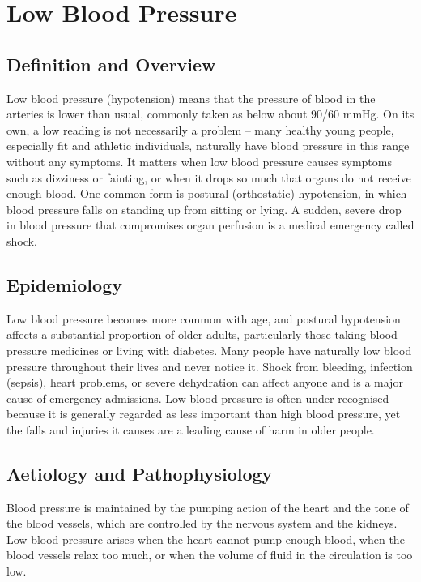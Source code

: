 \chapter{Low Blood Pressure}

\section*{Definition and Overview}
Low blood pressure (hypotension) means that the pressure of blood in the arteries is lower than usual, commonly taken as below about 90/60 mmHg. On its own, a low reading is not necessarily a problem -- many healthy young people, especially fit and athletic individuals, naturally have blood pressure in this range without any symptoms. It matters when low blood pressure causes symptoms such as dizziness or fainting, or when it drops so much that organs do not receive enough blood. One common form is postural (orthostatic) hypotension, in which blood pressure falls on standing up from sitting or lying. A sudden, severe drop in blood pressure that compromises organ perfusion is a medical emergency called shock.

\section*{Epidemiology}
Low blood pressure becomes more common with age, and postural hypotension affects a substantial proportion of older adults, particularly those taking blood pressure medicines or living with diabetes. Many people have naturally low blood pressure throughout their lives and never notice it. Shock from bleeding, infection (sepsis), heart problems, or severe dehydration can affect anyone and is a major cause of emergency admissions. Low blood pressure is often under-recognised because it is generally regarded as less important than high blood pressure, yet the falls and injuries it causes are a leading cause of harm in older people.

\section*{Aetiology and Pathophysiology}
Blood pressure is maintained by the pumping action of the heart and the tone of the blood vessels, which are controlled by the nervous system and the kidneys. Low blood pressure arises when the heart cannot pump enough blood, when the blood vessels relax too much, or when the volume of fluid in the circulation is too low.

